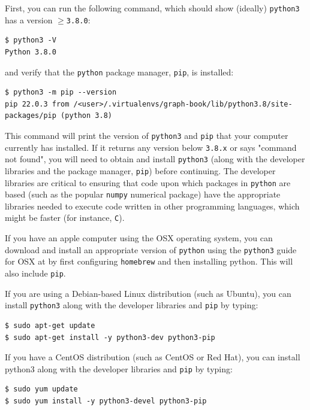 First, you can run the following command, which should show (ideally) \texttt{python3} has a version $\geq$\texttt{3.8.0}:

\begin{lstlisting}[style=bash]
$ python3 -V
Python 3.8.0
\end{lstlisting}

and verify that the \texttt{python} package manager, \texttt{pip}, is installed:

\begin{lstlisting}[style=bash]
$ python3 -m pip --version
pip 22.0.3 from /<user>/.virtualenvs/graph-book/lib/python3.8/site-packages/pip (python 3.8)
\end{lstlisting}

This command will print the version of \texttt{python3} and \texttt{pip} that your computer currently has installed. If it returns any version below \texttt{3.8.x} or says "command not found", you will need to obtain and install \texttt{python3} (along with the developer libraries and the package manager, \texttt{pip}) before continuing. The developer libraries are critical to ensuring that code upon which packages in \texttt{python} are based (such as the popular \texttt{numpy} numerical package) have the appropriate libraries needed to execute code written in {other} programming languages, which might be faster (for instance, \texttt{C}). 

If you have an apple computer using the OSX operating system, you can download and install an appropriate version of \texttt{python} using the \texttt{python3} guide for OSX at \cite{pythonmac} by first configuring \texttt{homebrew} and then installing python. This will also include \texttt{pip}. 

If you are using a Debian-based Linux distribution (such as Ubuntu), you can install \texttt{python3} along with the developer libraries and \texttt{pip} by typing:

\begin{lstlisting}[style=bash]
$ sudo apt-get update
$ sudo apt-get install -y python3-dev python3-pip
\end{lstlisting}

If you have a CentOS distribution (such as CentOS or Red Hat), you can install python3 along with the developer libraries and \texttt{pip} by typing:

\begin{lstlisting}[style=bash]
$ sudo yum update
$ sudo yum install -y python3-devel python3-pip
\end{lstlisting}

